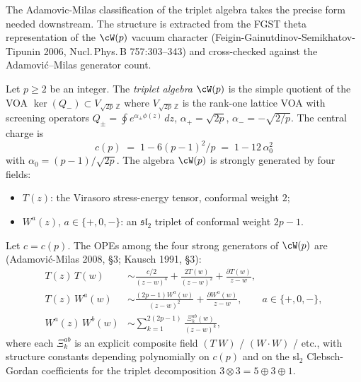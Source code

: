 The Adamovic-Milas classification of the triplet algebra takes the
precise form needed downstream. The structure is extracted from the
FGST theta representation of the $\cW(p)$ vacuum character
(Feigin-Gainutdinov-Semikhatov-Tipunin 2006,
Nucl.\,Phys.\,B 757:303--343) and cross-checked against the
Adamovi\'c--Milas generator count.

\begin{definition}
\label{def:triplet-wp-generators}
Let $p \ge 2$ be an integer. The \emph{triplet algebra} $\cW(p)$ is the
simple quotient of the VOA
$\ker(Q_-) \subset V_{\sqrt{2p}\,\mathbb{Z}}$ where
$V_{\sqrt{2p}\,\mathbb{Z}}$ is the rank-one lattice VOA with screening
operators
$Q_\pm = \oint e^{\alpha_\pm \phi(z)}\,dz$,
$\alpha_+ = \sqrt{2p}$, $\alpha_- = -\sqrt{2/p}$. The central charge
is
\[
 c(p) \;=\; 1 - 6(p-1)^2 / p \;=\; 1 - 12\,\alpha_0^2
\]
with $\alpha_0 = (p-1)/\sqrt{2p}$. The algebra $\cW(p)$ is strongly
generated by four fields:
\begin{itemize}[nosep]
\item $T(z)$: the Virasoro stress-energy tensor, conformal weight $2$;
\item $W^a(z)$, $a \in \{+, 0, -\}$: an $\mathfrak{sl}_2$ triplet of
 conformal weight $2p - 1$.
\end{itemize}
\end{definition}

\begin{proposition}
\label{prop:wp-ope-structure}
Let $c = c(p)$. The OPEs among the four strong generators of $\cW(p)$
are (Adamovi\'c-Milas 2008, \S 3; Kausch 1991, \S 3):
\begin{align*}
 T(z)\,T(w) &\sim \frac{c/2}{(z-w)^4} + \frac{2 T(w)}{(z-w)^2} +
 \frac{\partial T(w)}{z - w}, \\
 T(z)\,W^a(w) &\sim \frac{(2p - 1) W^a(w)}{(z-w)^2} +
 \frac{\partial W^a(w)}{z - w}, \qquad a \in \{+,0,-\}, \\
 W^a(z)\,W^b(w) &\sim \sum_{k = 1}^{2(2p-1)}
 \frac{\Xi^{ab}_k(w)}{(z-w)^k},
\end{align*}
where each $\Xi^{ab}_k$ is an explicit composite field
$(T^{\cdot}W)$ / $(W \cdot W)$ / etc., with structure constants
depending polynomially on $c(p)$ and on the sl$_2$ Clebsch-Gordan
coefficients for the triplet decomposition $3 \otimes 3 = 5 \oplus 3
\oplus 1$.
\end{proposition}

